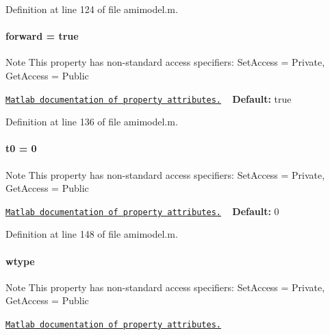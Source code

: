 Definition at line 124 of file amimodel.\+m.

\hypertarget{classamimodel_a81e42e48c9c72814166c8f7cd414ce24}{}
\paragraph[{forward}]{\setlength{\rightskip}{0pt plus 5cm}forward = true}\label{classamimodel_a81e42e48c9c72814166c8f7cd414ce24}
\begin{DoxyNote}{Note}
This property has non-\/standard access specifiers\+: {\ttfamily Set\+Access = Private, Get\+Access = Public} 

\href{http://www.mathworks.com/help/matlab/matlab_oop/property-attributes.html}{\tt Matlab documentation of property attributes.} ~\newline
{\bfseries Default\+:} true 
\end{DoxyNote}


Definition at line 136 of file amimodel.\+m.

\hypertarget{classamimodel_abdb5a42ffee3ca622484b53a322f1004}{}
\paragraph[{t0}]{\setlength{\rightskip}{0pt plus 5cm}t0 = 0}\label{classamimodel_abdb5a42ffee3ca622484b53a322f1004}
\begin{DoxyNote}{Note}
This property has non-\/standard access specifiers\+: {\ttfamily Set\+Access = Private, Get\+Access = Public} 

\href{http://www.mathworks.com/help/matlab/matlab_oop/property-attributes.html}{\tt Matlab documentation of property attributes.} ~\newline
{\bfseries Default\+:} 0 
\end{DoxyNote}


Definition at line 148 of file amimodel.\+m.

\hypertarget{classamimodel_a5376250224ce32fb558d88aa0b5a93ff}{}
\paragraph[{wtype}]{\setlength{\rightskip}{0pt plus 5cm}wtype}\label{classamimodel_a5376250224ce32fb558d88aa0b5a93ff}
\begin{DoxyNote}{Note}
This property has non-\/standard access specifiers\+: {\ttfamily Set\+Access = Private, Get\+Access = Public} 

\href{http://www.mathworks.com/help/matlab/matlab_oop/property-attributes.html}{\tt Matlab documentation of property attributes.} 
\end{DoxyNote}


